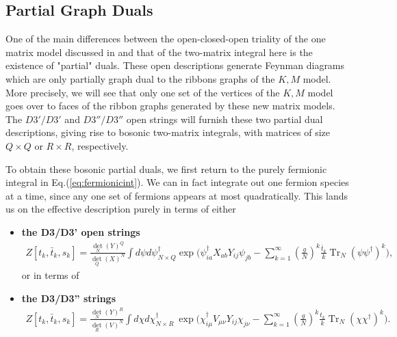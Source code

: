 \documentclass[english]{article}
\DeclareMathOperator{\Tr}{Tr}
\renewcommand{\>}{\rangle}
\newcommand{\<}{\langle}
\renewcommand{\(}{\left(}
\renewcommand{\)}{\right)}
\begin{document}
 


\subsection{Partial Graph Duals}\label{sec:OCOpartials}

One of the main differences between the open-closed-open triality of the one matrix model discussed in \cite{DSDI} and that of the two-matrix integral here is the existence of "partial" duals. These open descriptions generate Feynman diagrams which are only partially graph dual to the ribbons graphs of the $K,M$ model. More precisely, we will see that only one set of the vertices of the $K,M$ model goes over to faces of the ribbon graphs generated by these new matrix models. The $D3'/D3'$ and $D3''/D3''$ open strings will furnish these two partial dual descriptions, giving rise to bosonic two-matrix integrals, with matrices of size $Q \times Q$ or $R \times R$, respectively. 



To obtain these bosonic partial duals, we first return to the purely fermionic integral in Eq.(\ref{eq:fermionicint}). We can in fact integrate out one fermion species at a time, since any one set of fermions appears at most quadratically. This lands us on the effective description purely in terms of either 
\begin{itemize}
    \item \textbf{the D3/D3' open strings }
\begin{align}\label{eq:justpsi}
    Z[t_{k},\bar{t}_{k},s_{k}] =\frac{\det_N(Y)^Q}{\det_Q(X)^N}\int d\psi d\psi^{\dagger}_{N \times Q}\exp\bigg(\psi^{\dagger}_{ia}X_{ab}Y_{ij}\psi_{jb} - \sum_{k=1}^{\infty}(\frac{g}{N})^{k}\frac{\bar{t}_{k}}{k}\Tr_N(\psi\psi^{\dagger})^k\bigg), 
\end{align}
or in terms of 
\item  \textbf{the D3/D3'' strings }
\begin{align}\label{eq:justchi}
    Z[t_{k},\bar{t}_{k},s_{k}] =\frac{\det_N(Y)^R}{\det_R(V)^N}\int d\chi d\chi^{\dagger}_{N \times R}\ \exp\bigg(\chi^{\dagger}_{i\mu}V_{\mu\nu}Y_{ij}\chi_{j\nu}- \sum_{k=1}^{\infty}(\frac{g}{N})^{k}\frac{t_{k}}{k} \Tr_N(\chi\chi^{\dagger})^k\bigg).
\end{align}
\end{itemize}
\end{document}
